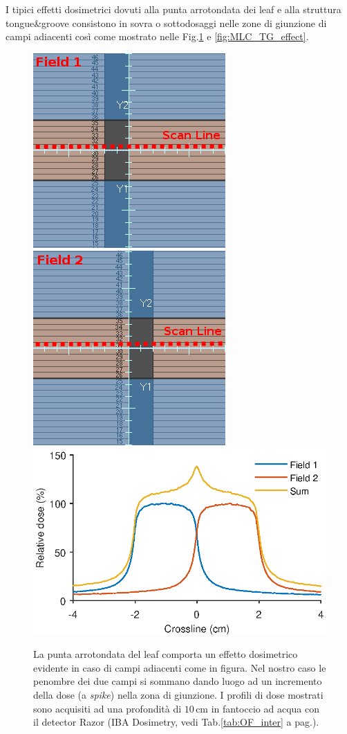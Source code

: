 I tipici effetti dosimetrici dovuti alla punta arrotondata dei leaf e alla struttura tongue\&{}groove consistono in sovra o sottodosaggi nelle zone di giunzione di campi adiacenti così come mostrato nelle Fig.\ref{fig:MLC_tip_effect} e \ref{fig:MLC_TG_effect}.
\begin{figure}[!t]
\centering
\includegraphics[width=.35\textwidth]{./cap2/tip5.png}
\includegraphics[width=.35\textwidth]{./cap2/tip6.png}\\\vspace{.3cm}
\includegraphics[width=.7\textwidth]{./cap2/MLC_Plots/Abutted/abutted_m.eps}
\caption{La punta arrotondata del leaf comporta un effetto dosimetrico evidente in caso di campi adiacenti come in figura. Nel nostro caso le penombre dei due campi si sommano dando luogo ad un incremento della dose (a \textit{spike}) nella zona di giunzione. I profili di dose mostrati sono acquisiti ad una profondità di $10\,$cm in fantoccio ad acqua con il detector Razor (IBA Dosimetry, vedi Tab.\ref{tab:OF_inter} a pag.\pageref{tab:OF_inter}).}
\label{fig:MLC_tip_effect}
\end{figure}
